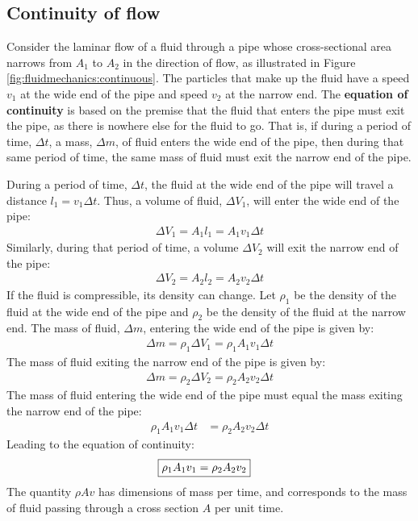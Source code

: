 {{\subsection{Continuity of flow}
Consider the laminar flow of a fluid through a pipe whose cross-sectional area narrows from $A_1$ to $A_2$ in the direction of flow, as illustrated in Figure \ref{fig:fluidmechanics:continuous}.
The particles that make up the fluid have a speed $v_1$ at the wide end of the pipe and speed $v_2$ at the narrow end. The \textbf{equation of continuity} is based on the premise that the fluid that enters the pipe must exit the pipe, as there is nowhere else for the fluid to go. That is, if during a period of time, $\Delta t$, a mass, $\Delta m$, of fluid enters the wide end of the pipe, then during that same period of time, the same mass of fluid must exit the narrow end of the pipe. 

During a period of time, $\Delta t$, the fluid at the wide end of the pipe will travel a distance $l_1=v_1\Delta t$. Thus, a volume of fluid, $\Delta V_1$, will enter the wide end of the pipe:
\begin{align*}
\Delta V_1 = A_1 l_1 = A_1 v_1 \Delta t
\end{align*}
Similarly, during that period of time, a volume $\Delta V_2$ will exit the narrow end of the pipe:
\begin{align*}
\Delta V_2 = A_2 l_2 = A_2 v_2 \Delta t
\end{align*}
If the fluid is compressible, its density can change. Let $\rho_1$ be the density of the fluid at the wide end of the pipe and $\rho_2$ be the density of the fluid at the narrow end. The mass of fluid, $\Delta m$, entering the wide end of the pipe is given by:
\begin{align*}
\Delta m = \rho_1 \Delta V_1= \rho_1 A_1 v_1 \Delta t
\end{align*}
The mass of fluid exiting the narrow end of the pipe is given by:
\begin{align*}
\Delta m = \rho_2 \Delta V_2= \rho_2 A_2 v_2 \Delta t
\end{align*}
The mass of fluid entering the wide end of the pipe must equal the mass exiting the narrow end of the pipe:
\begin{align*}
\rho_1 A_1 v_1 \Delta t &= \rho_2 A_2 v_2 \Delta t
\end{align*}
Leading to the equation of continuity:
\begin{align}
\Aboxed{\rho_1 A_1 v_1 &= \rho_2 A_2 v_2}
\end{align}
The quantity $\rho A v$ has dimensions of mass per time, and corresponds to the mass of fluid passing through a cross section $A$ per unit time.

}}
